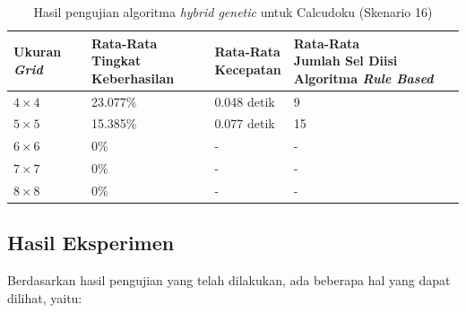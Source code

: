 \begin{table}
\centering
\captionsetup{justification=centering}
\caption[Hasil pengujian algoritma \textit{hybrid genetic} untuk Calcudoku (Skenario 16)]{Hasil pengujian algoritma \textit{hybrid genetic} untuk Calcudoku (Skenario 16)}
\begin{tabular}{| l | l | l | l |}
\hline
Ukuran \textit{Grid} & \makecell[c]{Rata-Rata \\ Tingkat Keberhasilan} & \makecell[c]{Rata-Rata \\ Kecepatan} & \makecell[c]{Rata-Rata \\ Jumlah Sel Diisi Algoritma \textit{Rule Based}} \\
\hline \hline
\begin{math}4 \times 4\end{math} & 23.077\% & 0.048 detik & 9 \\
\hline
\begin{math}5 \times 5\end{math} & 15.385\% & 0.077 detik & 15 \\
\hline
\begin{math}6 \times 6\end{math} & 0\% & - & - \\
\hline
\begin{math}7 \times 7\end{math} & 0\% & - & - \\
\hline
\begin{math}8 \times 8\end{math} & 0\% & - & - \\
\hline
\end{tabular}
\label{tab:pengujianhg16}
\end{table}
\clearpage

\subsection{Hasil Eksperimen}
\label{sec:hasileksperimen}

Berdasarkan hasil pengujian yang telah dilakukan, ada beberapa hal yang dapat dilihat, yaitu:

